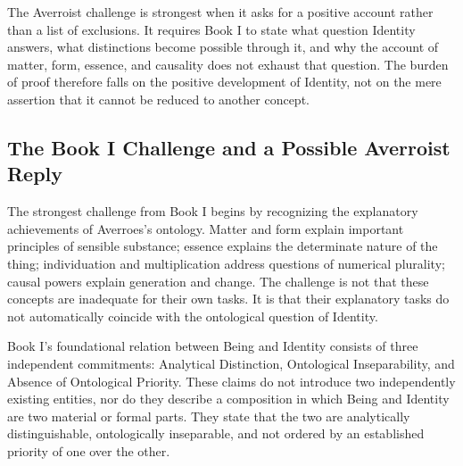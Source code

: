 The Averroist challenge is strongest when
it asks for a positive account rather than
a list of exclusions. It requires Book I
to state what question Identity answers,
what distinctions become possible through
it, and why the account of matter, form,
essence, and causality does not exhaust
that question. The burden of proof therefore
falls on the positive development of Identity,
not on the mere assertion that it cannot be
reduced to another concept.



\subsection{The Book I Challenge and a Possible Averroist Reply}
\label{subsec:ch08_s15_ss15}

\label{para:VS.B01.P01.C08.S15.SS15.P001}

The strongest challenge from Book I begins
by recognizing the explanatory achievements
of Averroes's ontology. Matter and form
explain important principles of sensible
substance; essence explains the determinate
nature of the thing; individuation and
multiplication address questions of numerical
plurality; causal powers explain generation
and change. The challenge is not that these
concepts are inadequate for their own tasks.
It is that their explanatory tasks do not
automatically coincide with the ontological
question of Identity.

\label{para:VS.B01.P01.C08.S15.SS15.P002}

Book I's foundational relation between
Being and Identity consists of three
independent commitments: Analytical
Distinction, Ontological Inseparability,
and Absence of Ontological Priority.
These claims do not introduce two independently
existing entities, nor do they describe
a composition in which Being and Identity
are two material or formal parts. They
state that the two are analytically
distinguishable, ontologically inseparable,
and not ordered by an established priority
of one over the other.

\label{para:VS.B01.P01.C08.S15.SS15.P003}

